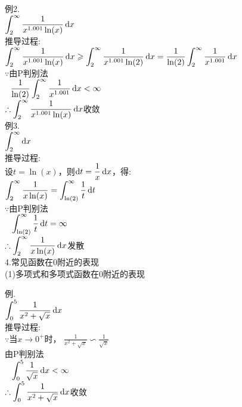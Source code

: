 例2.\\
$\displaystyle\int_2^{\infty}\frac{1}{x^{1.001}\ln(x)}\mathop{}\!\mathrm{d} x$\\
推导过程:\\
$\displaystyle\int_2^{\infty}\frac{1}{x^{1.001}\ln(x)}\mathop{}\!\mathrm{d} x\geqslant\int_2^{\infty}\frac{1}{x^{1.001}\ln(2)}\mathop{}\!\mathrm{d} x=\frac{1}{\ln(2)}\int_2^{\infty}\frac{1}{x^{1.001}}\mathop{}\!\mathrm{d} x$\\
$\because$由P判别法\\
$\displaystyle\phantom{\because}\frac{1}{\ln(2)}\int_2^{\infty}\frac{1}{x^{1.001}}\mathop{}\!\mathrm{d} x<\infty$\\
$\displaystyle\therefore\int_2^{\infty}\frac{1}{x^{1.001}\ln(x)}\mathop{}\!\mathrm{d} x$收敛\\

例3.\\
$\displaystyle\int_2^{\infty}\mathop{}\!\mathrm{d} x$\\
推导过程:\\
设$t=\ln(x)$，则$\mathop{}\!\mathrm{d} t=\dfrac{1}{x}\mathop{}\!\mathrm{d} x$，得:\\
$\displaystyle\int_2^{\infty}\frac{1}{x\ln(x)}=\int_{\ln(2)}^{\infty}\frac{1}{t}\mathop{}\!\mathrm{d} t$\\
$\because$由P判别法\\
$\displaystyle\phantom{\because}\int_{\ln(2)}^{\infty}\frac{1}{t}\mathop{}\!\mathrm{d} t=\infty$\\
$\displaystyle\therefore\int_2^{\infty}\frac{1}{x\ln(x)}\mathop{}\!\mathrm{d} x$发散\\[4ex]

4.常见函数在$0$附近的表现\\
(1)多项式和多项式函数在$0$附近的表现
{\par\centering
{}
\par}
例.\\
$\displaystyle\int_0^5\frac{1}{x^2+\sqrt{x}}\mathop{}\!\mathrm{d} x$\\
推导过程:\\
$\because$当$x\to 0^+$时， $\displaystyle\frac{1}{x^2+\sqrt{x}}\backsim\frac{1}{\sqrt{x}}$\\
\phantom{$\because$}由P判别法\\
$\displaystyle\phantom{\because}\int_0^5\frac{1}{\sqrt{x}}\mathop{}\!\mathrm{d} x<\infty$\\
$\displaystyle\therefore\int_0^5\frac{1}{x^2+\sqrt{x}}\mathop{}\!\mathrm{d} x$收敛\\[2ex]

